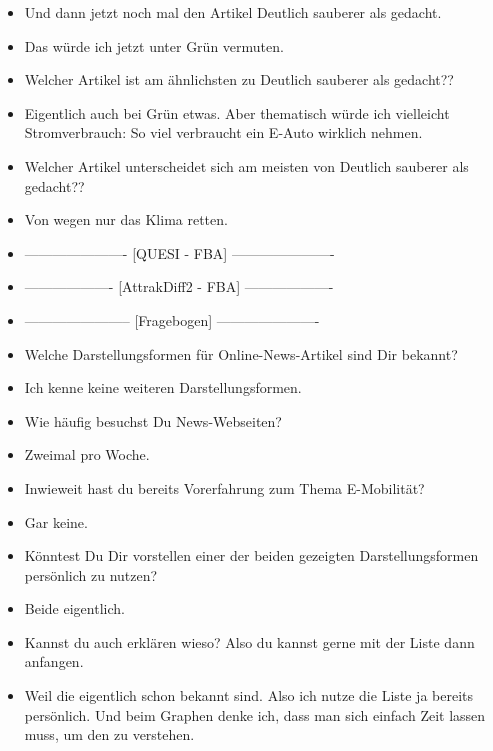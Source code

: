 {\begin{itemize}[]
        \item {} Und dann jetzt noch mal den Artikel \flqq Deutlich sauberer als gedacht\frqq{}.
        \item {} Das würde ich jetzt unter Grün vermuten.
        \item {} Welcher Artikel ist am ähnlichsten zu \flqq Deutlich sauberer als gedacht?\frqq{}?
        \item {} Eigentlich auch bei Grün etwas.
              Aber thematisch würde ich vielleicht \flqq Stromverbrauch: So viel verbraucht ein E-Auto wirklich\frqq{} nehmen.
        \item {} Welcher Artikel unterscheidet sich am meisten von \flqq Deutlich sauberer als gedacht?\frqq{}?
        \item {} \flqq Von wegen nur das Klima retten\frqq{}.
        \item {----------------------} [QUESI - FBA] {----------------------}
        \item {-------------------} [AttrakDiff2 - FBA] {-------------------}
        \item {-----------------------} [Fragebogen] {----------------------}
        \item {} Welche Darstellungsformen für Online-News-Artikel sind Dir bekannt?
        \item {} Ich kenne keine weiteren Darstellungsformen.
        \item {} Wie häufig besuchst Du News-Webseiten?
        \item {} Zweimal pro Woche.
        \item {} Inwieweit hast du bereits Vorerfahrung zum Thema E-Mobilität?
        \item {} Gar keine.
        \item {} Könntest Du Dir vorstellen einer der beiden gezeigten Darstellungsformen persönlich zu nutzen?
        \item {} Beide eigentlich.
        \item {} Kannst du auch erklären wieso? Also du kannst gerne mit der Liste dann anfangen.
        \item {} Weil die eigentlich schon bekannt sind.
              Also ich nutze die Liste ja bereits persönlich.
              Und beim Graphen denke ich, dass man sich einfach Zeit lassen muss, um den zu verstehen.

\end{itemize}}

